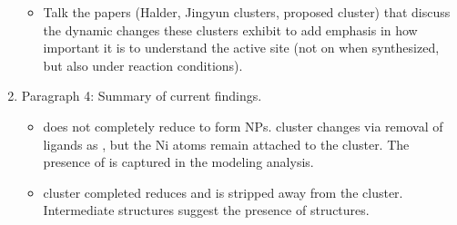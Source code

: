 \documentclass[journal=jctcce,manuscript=article]{achemso}
\begin{document}
\begin{enumerate}
\begin{itemize}
        \item Talk the papers (Halder, Jingyun  clusters,  proposed cluster) that discuss the dynamic changes these clusters exhibit to add emphasis in how important it is to understand the active site (not on when synthesized, but also under reaction conditions). 
    \end{itemize}
    \item Paragraph 4: Summary of current findings. 
    \begin{itemize}
        \item {} does not completely reduce to form NPs.  cluster changes via removal of  ligands as , but the Ni atoms remain attached to the cluster. The presence of  is captured in the modeling analysis. 
        \item {} cluster completed reduces and is stripped away from the cluster. Intermediate structures suggest the presence of  structures. 
    \end{itemize}
\end{enumerate}











\end{document}
